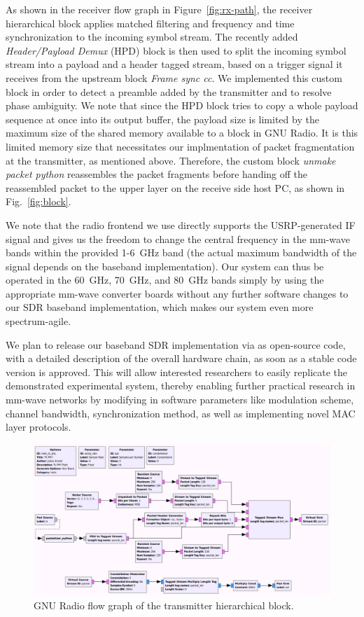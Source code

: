 \documentclass{sig-alternate}
\begin{document}
As shown in the receiver flow graph in Figure~\ref{fig:rx-path}, the receiver hierarchical block applies matched filtering and frequency and time synchronization to the incoming symbol stream. The recently added \textit{Header/Payload Demux} (HPD) block is then used to split the incoming symbol stream into a payload and a header tagged stream, based on a trigger signal it receives from the upstream block \textit{Frame sync cc}. We implemented this custom block in order to detect a preamble added by the transmitter and to resolve phase ambiguity. We note that since the HPD block tries to copy a whole payload sequence at once into its output buffer, the payload size is limited by the maximum size of the shared memory available to a block in GNU Radio. It is this limited memory size that necessitates our implmentation of packet fragmentation at the transmitter, as mentioned above. Therefore, the custom block \textit{unmake packet python} reassembles the packet fragments before handing off the reassembled packet to the upper layer on the receive side host PC, as shown in Fig.~\ref{fig:block}.

We note that the radio frontend we use directly supports the USRP-generated IF signal and gives us the freedom to change the central frequency in the mm-wave bands within the provided 1-6~GHz band (the actual maximum bandwidth of the signal depends on the baseband implementation).  Our system can thus be operated in the 60~GHz, 70~GHz, and 80~GHz bands simply by using the appropriate mm-wave converter boards without any further software changes to our SDR baseband implementation, which makes our system even more spectrum-agile.

We plan to release our baseband SDR implementation via \cite{gr-inets} as open-source code, with a detailed description of the overall hardware chain, as soon as a stable code version is approved. This will allow interested researchers to easily replicate the demonstrated experimental system, thereby enabling further practical research in mm-wave networks by modifying in software parameters like modulation scheme, channel bandwidth, synchronization method, as well as implementing novel MAC layer protocols.

\begin{figure}[p]
\center
\includegraphics[scale=0.41]{tx_path.png}
\caption{GNU Radio flow graph of the transmitter hierarchical block.}
\label{fig:tx-path}
\end{figure}
\end{document}
